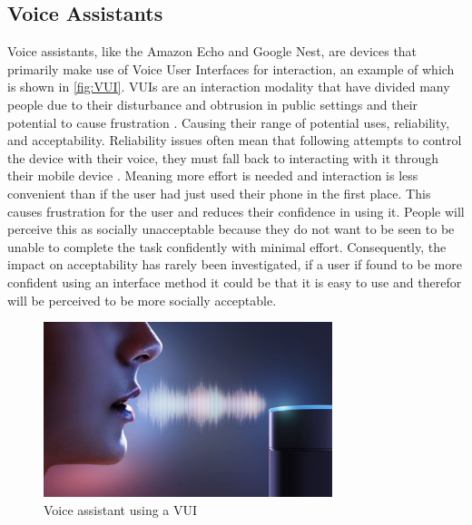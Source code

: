 \documentclass{l4proj}
\begin{document}
\subsection{Voice Assistants}

Voice assistants, like the Amazon Echo and Google Nest, are devices that primarily make use of Voice User Interfaces for interaction, an example of which is shown in \autoref{fig:VUI}. VUIs are an interaction modality that have divided many people due to their disturbance and obtrusion in public settings \citep{lee_interaction_2018} and their potential to cause frustration \citep{myers_patterns_2018}. Causing their range of potential uses, reliability, and acceptability. Reliability issues often mean that following attempts to control the device with their voice, they must fall back to interacting with it through their mobile device \citep{myers_patterns_2018}. Meaning more effort is needed and interaction is less convenient than if the user had just used their phone in the first place. This causes frustration for the user and reduces their confidence in using it. People will perceive this as socially unacceptable because they do not want to be seen to be unable to complete the task confidently with minimal effort. Consequently, the impact on acceptability has rarely been investigated, if a user if found to be more confident using an interface method it could be that it is easy to use and therefor will be perceived to be more socially acceptable.

\begin{figure}[h!]
    \centering
    \includegraphics[width=0.75\textwidth]{images/VUI.jpg}
        \caption{Voice assistant using a VUI}
        \label{fig:VUI}
\end{figure}
\end{document}
